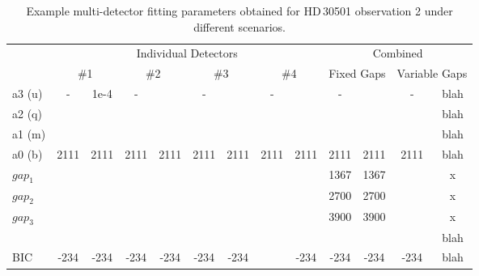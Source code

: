\begin{table}
    \small
    \caption[Example multi-detector fitting parameters.]{Example multi-detector fitting parameters obtained for HD\,30501 observation 2 under different scenarios.}
    \begin{tabular}{|l|c|c|c|c|c|c|c|c|c|c|c|c|}
    	\toprule
    	  &    \multicolumn{8}{c|}{Individual Detectors}    &    \multicolumn{4}{c|}{Combined}    \\
    	  & \multicolumn{2}{c|}{\#1} & \multicolumn{2}{c|}{\#2} & \multicolumn{2}{c|}{\#3} & \multicolumn{2}{c|}{\#4} & \multicolumn{2}{c|}{Fixed Gaps} & \multicolumn{2}{c|}{Variable Gaps} \\ \midrule
    	a3 (u)    &  -   &    1e-4    &  -   &    &  -   &    &  -   &    &  -   &    &  -   &    blah    \\
    	a2 (q)    &      &    &    &    &    &    &    &    &    &    &    &    blah    \\
    	a1 (m)   &      &    &    &    &    &    &    &    &    &    &    &    blah    \\
    	a0 (b)    & 2111 &    2111    & 2111 &    2111    & 2111 &    2111    & 2111 &    2111    & 2111 &    2111    & 2111 & blah \\
        \(gap_{1}\) &      &    &    &    &    &    &    &    &   1367  & 1367   &   & x\\
        \(gap_{2}\) &      &    &    &    &    &    &    &    &  2700   &  2700  &   & x\\
        \(gap_{3}\) &      &    &    &    &    &    &    &    &   3900 &   3900 &    & x\\
    	\textchisquared{} &    &    &    &    &    &    &    &    &    &    &    &    blah    \\
    	BIC        & -234      &    -234    & -234 &    -234    & -234 &    -234    &    &    -234    & -234 &    -234    & -234 &    blah  \\
        \bottomrule
    \end{tabular}\label{tab:example_calibration_parametres}
\end{table}


